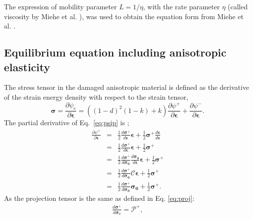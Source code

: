 \documentclass[3p,10pt,sort&compress]{elsarticle}
\begin{document}
The expression of mobility parameter $L = 1/\eta$, with the rate parameter $\eta$ (called viscosity by Miehe et al. \cite{miehe2010phase}), was used to obtain the equation form from Miehe et al. \cite{miehe2010thermodynamically}.
\subsection{Equilibrium equation including anisotropic elasticity}
The stress tensor in the damaged anisotropic material is defined as the derivative of the strain energy density with respect to the strain tensor,
\begin{equation}
  \boldsymbol{\sigma} = \frac{\partial \psi_e}{\partial \boldsymbol{\epsilon}} = ((1-d)^2(1-k) + k)\frac{\partial \psi^+}{\partial \boldsymbol{\epsilon}} + \frac{\partial \psi^-}{\partial \boldsymbol{\epsilon}}.\label{eq:thdynew}
\end{equation}
The partial derivative of Eq.~\eqref{eq:psip} is ;
\begin{eqnarray}
  \frac{\partial \psi^+}{\partial \boldsymbol{\epsilon}} &=& \frac{1}{2} \frac{d\boldsymbol{\sigma}^+}{d\boldsymbol{\epsilon}}\boldsymbol{\epsilon} + \frac{1}{2}\boldsymbol{\sigma}^+ \frac{d\boldsymbol{\epsilon}}{d\boldsymbol{\epsilon}} \\
  &=& \frac{1}{2} \frac{d\boldsymbol{\sigma}^+}{d\boldsymbol{\epsilon}}\boldsymbol{\epsilon} + \frac{1}{2}\boldsymbol{\sigma}^+ \\
  &=& \frac{1}{2}\frac{d \boldsymbol{\sigma^+}}{d \boldsymbol{\sigma_0}}\frac{d \boldsymbol{\sigma_0}}{d \boldsymbol{\epsilon}} \boldsymbol{\epsilon} + \frac{1}{2} \boldsymbol{\sigma^+} \\
  &=& \frac{1}{2} \frac{d\boldsymbol{\sigma}^+}{d\boldsymbol{\sigma_0}}\boldsymbol{\mathcal{C}} \boldsymbol{\epsilon} + \frac{1}{2}\boldsymbol{\sigma}^+  \\
  & =& \frac{1}{2} \frac{d\boldsymbol{\sigma}^+}{d\boldsymbol{\sigma_0}} \boldsymbol{\sigma_0} + \frac{1}{2}\boldsymbol{\sigma}^+.
\end{eqnarray}
As the projection tensor is the same as defined in Eq. \ref{eq:proj}:
\begin{eqnarray}
	\frac{d\boldsymbol{\sigma}^+}{d\boldsymbol{\sigma}_0}=\boldsymbol{\mathcal{P^+}},
\end{eqnarray}
\end{document}
